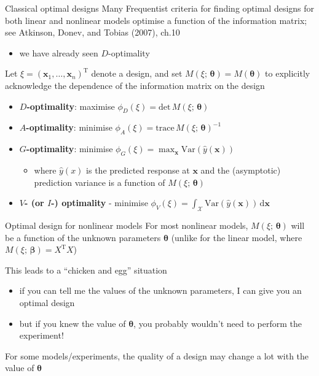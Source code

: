 \documentclass[
  ignorenonframetext,
]{beamer}
\providecommand{\tightlist}{%
  \setlength{\itemsep}{0pt}\setlength{\parskip}{0pt}}
\begin{document}
\begin{frame}{Classical optimal designs}
\protect\hypertarget{classical-optimal-designs}{}
Many Frequentist criteria for finding optimal designs for both linear
and nonlinear models optimise a function of the information matrix; see
Atkinson, Donev, and Tobias (2007), ch.10

\begin{itemize}
\tightlist
\item
  we have already seen \(D\)-optimality
\end{itemize}

Let \(\xi = (\boldsymbol{x}_1,\ldots,\boldsymbol{x}_n)^\mathrm{T}\)
denote a design, and set
\(M(\xi;\,\boldsymbol{\theta}) = M(\boldsymbol{\theta})\) to explicitly
acknowledge the dependence of the information matrix on the design

\begin{itemize}
\tightlist
\item
  \textbf{\(D\)-optimality}: maximise
  \(\phi_D(\xi) = \mbox{det}\, M(\xi;\,\boldsymbol{\theta})\)
\item
  \textbf{\(A\)-optimality}: minimise
  \(\phi_A(\xi) = \mbox{trace}\, M(\xi;\,\boldsymbol{\theta})^{-1}\)
\item
  \textbf{\(G\)-optimality}: minimise
  \(\phi_G(\xi) = \max_\boldsymbol{x}\mbox{Var}(\hat{y}(\boldsymbol{x}))\)

  \begin{itemize}
  \tightlist
  \item
    where \(\hat{y}(x)\) is the predicted response at \(\boldsymbol{x}\)
    and the (asymptotic) prediction variance is a function of
    \(M(\xi;\,\boldsymbol{\theta})\)
  \end{itemize}
\item
  \textbf{\(V\)- (or \(I\)-) optimality} - minimise
  \(\phi_V(\xi) = \int_\mathcal{X} \mbox{Var}\left(\hat{y}(\boldsymbol{x})\right)\,\mathrm{d}\boldsymbol{x}\)
\end{itemize}
\end{frame}

\begin{frame}{Optimal design for nonlinear models}
\protect\hypertarget{optimal-design-for-nonlinear-models}{}
For most nonlinear models, \(M(\xi;\,\boldsymbol{\theta})\) will be a
function of the unknown parameters \(\boldsymbol{\theta}\) (unlike for
the linear model, where \(M(\xi;\,\boldsymbol{\beta}) = X^\mathrm{T}X\))

This leads to a ``chicken and egg'' situation

\begin{itemize}
\tightlist
\item
  if you can tell me the values of the unknown parameters, I can give
  you an optimal design
\item
  but if you knew the value of \(\boldsymbol{\theta}\), you probably
  wouldn't need to perform the experiment!
\end{itemize}

For some models/experiments, the quality of a design may change a lot
with the value of \(\boldsymbol{\theta}\)
\end{frame}
\end{document}
